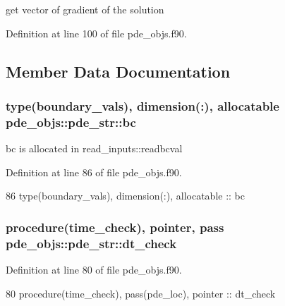 get vector of gradient of the solution 



Definition at line 100 of file pde\+\_\+objs.\+f90.



\subsection{Member Data Documentation}
\subsubsection[{bc}]{\setlength{\rightskip}{0pt plus 5cm}type({\bf boundary\+\_\+vals}), dimension(\+:), allocatable pde\+\_\+objs\+::pde\+\_\+str\+::bc}\label{structpde__objs_1_1pde__str_a3bfd682ac96ce9288d89378db1e0b735}


bc is allocated in read\+\_\+inputs\+::readbcval 



Definition at line 86 of file pde\+\_\+objs.\+f90.


\begin{DoxyCode}
86     \textcolor{keywordtype}{type}(boundary_vals), \textcolor{keywordtype}{dimension(:)}, \textcolor{keywordtype}{allocatable}   :: bc
\end{DoxyCode}
\subsubsection[{dt\+\_\+check}]{\setlength{\rightskip}{0pt plus 5cm}procedure({\bf time\+\_\+check}), pointer, pass pde\+\_\+objs\+::pde\+\_\+str\+::dt\+\_\+check}\label{structpde__objs_1_1pde__str_ad35bb1d528be20427e6f57025675818d}


Definition at line 80 of file pde\+\_\+objs.\+f90.


\begin{DoxyCode}
80     \textcolor{keywordtype}{procedure}(time_check), pass(pde\_loc), \textcolor{keywordtype}{pointer}    :: dt\_check
\end{DoxyCode}
